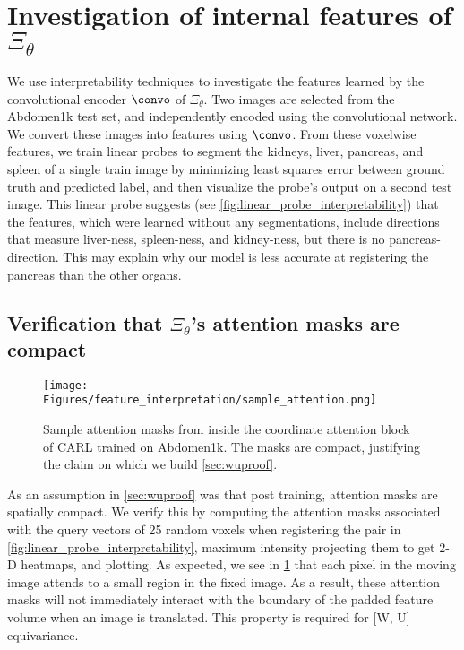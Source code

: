 \section{Investigation of internal features of $\Xi_\theta$}

We use interpretability techniques to investigate the features learned by the convolutional encoder $\convo$ of $\Xi_\theta$. Two images are selected from the Abdomen1k test set, and independently encoded using the convolutional network. We convert these images into features using $\convo$. From these voxelwise features, we train linear probes to segment the kidneys, liver, pancreas, and spleen of a single train image by minimizing least squares error between ground truth and predicted label, and then visualize the probe's output on a second test image. This linear probe suggests (see \ref{fig:linear_probe_interpretability}) that the features, which were learned without any segmentations, include directions that measure liver-ness, spleen-ness, and kidney-ness, but there is no pancreas-direction. This may explain why our model is less accurate at registering the pancreas than the other organs. 


\subsection{Verification that $\Xi_\theta$'s attention masks are compact}

\begin{figure}
    \centering
    \texttt{[image: Figures/feature\_interpretation/sample\_attention.png]}
    \caption{Sample attention masks from inside the coordinate attention block of CARL trained on Abdomen1k. The masks are compact, justifying the claim on which we build \ref{sec:wuproof}.}
    \label{fig:attention_samples}
\end{figure}


As an assumption in \ref{sec:wuproof} was that post training, attention masks are spatially compact. We verify this by computing the attention masks associated with the query vectors of 25 random voxels when registering the pair in \ref{fig:linear_probe_interpretability}, maximum intensity projecting them to get 2-D heatmaps, and plotting. As expected, we see in \ref{fig:attention_samples} that each pixel in the moving image attends to a small region in the fixed image. As a result, these attention masks will not immediately interact with the boundary of the padded feature volume when an image is translated. This property is required for [W, U] equivariance.


